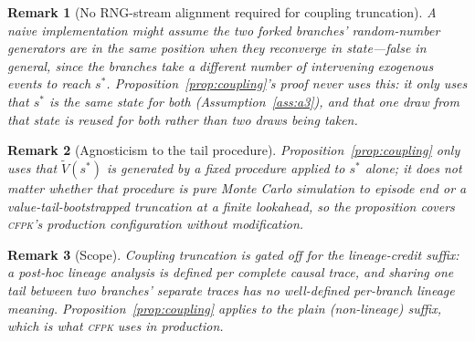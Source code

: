 \documentclass[review,authoryear,3p,times]{elsarticle}
\newtheorem{remark}{Remark}
\newcommand{\cfpk}{\textsc{cfpk}}
\begin{document}
\begin{remark}[No RNG-stream alignment required for coupling truncation]
A naive implementation might assume the two forked branches' random-number
generators are in the same position when they reconverge in state---false in
general, since the branches take a different number of intervening exogenous
events to reach $s^{*}$. Proposition~\ref{prop:coupling}'s proof never uses
this: it only uses that $s^{*}$ is the same state for both
(Assumption~\ref{ass:a3}), and that one draw from that state is reused for
both rather than two draws being taken.
\end{remark}

\begin{remark}[Agnosticism to the tail procedure]
Proposition~\ref{prop:coupling} only uses that $\tilde V(s^{*})$ is generated
by a fixed procedure applied to $s^{*}$ alone; it does not matter whether
that procedure is pure Monte Carlo simulation to episode end or a
value-tail-bootstrapped truncation at a finite lookahead, so the proposition
covers \cfpk's production configuration without modification.
\end{remark}

\begin{remark}[Scope]
Coupling truncation is gated off for the lineage-credit suffix: a post-hoc
lineage analysis is defined per complete causal trace, and sharing one tail
between two branches' separate traces has no well-defined per-branch lineage
meaning. Proposition~\ref{prop:coupling} applies to the plain (non-lineage)
suffix, which is what \cfpk{} uses in production.
\end{remark}
\end{document}
